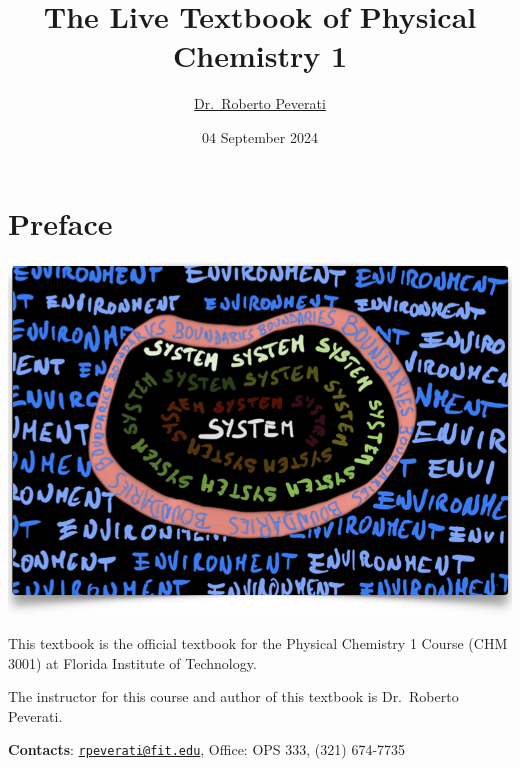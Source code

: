 \documentclass[
  9pt,
]{extbook}
\title{The Live Textbook of Physical Chemistry 1}
\author{\href{mailto:rpeverati@fit.edu}{Dr.~Roberto Peverati}}
\date{04 September 2024}
\let\oldmaketitle\maketitle
\theoremstyle{definition}
\theoremstyle{definition}
\theoremstyle{definition}
\theoremstyle{remark}
\begin{document}
\maketitle


%
\newpage

\let\maketitle\oldmaketitle

\renewcommand\thepage{\romannumeral\numexpr\value{page}-1\relax}


{
\setcounter{tocdepth}{1}
\tableofcontents
}
\renewcommand{\arraystretch}{1.8}

\hypertarget{preface}{%
\chapter*{Preface}\label{preface}}

\begin{center}\includegraphics[width=0.8\linewidth]{./img/OEP_Figures.000} \end{center}

This textbook is the official textbook for the Physical Chemistry 1 Course (CHM 3001) at Florida Institute of Technology.

The instructor for this course and author of this textbook is Dr.~Roberto Peverati.

\textbf{Contacts}: \href{mailto:rpeverati@fit.edu}{\nolinkurl{rpeverati@fit.edu}}, Office: OPS 333, (321) 674-7735
\end{document}
